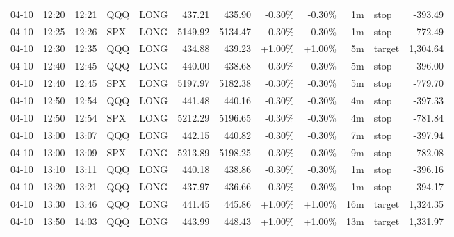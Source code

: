 \documentclass[11pt,a4paper,twoside]{article}
\begin{document}
\begin{center}
\begin{longtable}{>{\color{txtmain}}l l l l l r r r r r >{\color{txtmain}}l r}
04-10 & 12:20 & 12:21 & QQQ & LONG & 437.21 & 435.90 & \textcolor{lossred}{-0.30\%} & \textcolor{lossred}{-0.30\%} & 1m & stop & \textcolor{lossred}{-393.49} \\
04-10 & 12:25 & 12:26 & SPX & LONG & 5149.92 & 5134.47 & \textcolor{lossred}{-0.30\%} & \textcolor{lossred}{-0.30\%} & 1m & stop & \textcolor{lossred}{-772.49} \\
04-10 & 12:30 & 12:35 & QQQ & LONG & 434.88 & 439.23 & \textcolor{wingreen}{+1.00\%} & \textcolor{wingreen}{+1.00\%} & 5m & target & \textcolor{wingreen}{1,304.64} \\
04-10 & 12:40 & 12:45 & QQQ & LONG & 440.00 & 438.68 & \textcolor{lossred}{-0.30\%} & \textcolor{lossred}{-0.30\%} & 5m & stop & \textcolor{lossred}{-396.00} \\
04-10 & 12:40 & 12:45 & SPX & LONG & 5197.97 & 5182.38 & \textcolor{lossred}{-0.30\%} & \textcolor{lossred}{-0.30\%} & 5m & stop & \textcolor{lossred}{-779.70} \\
04-10 & 12:50 & 12:54 & QQQ & LONG & 441.48 & 440.16 & \textcolor{lossred}{-0.30\%} & \textcolor{lossred}{-0.30\%} & 4m & stop & \textcolor{lossred}{-397.33} \\
04-10 & 12:50 & 12:54 & SPX & LONG & 5212.29 & 5196.65 & \textcolor{lossred}{-0.30\%} & \textcolor{lossred}{-0.30\%} & 4m & stop & \textcolor{lossred}{-781.84} \\
04-10 & 13:00 & 13:07 & QQQ & LONG & 442.15 & 440.82 & \textcolor{lossred}{-0.30\%} & \textcolor{lossred}{-0.30\%} & 7m & stop & \textcolor{lossred}{-397.94} \\
04-10 & 13:00 & 13:09 & SPX & LONG & 5213.89 & 5198.25 & \textcolor{lossred}{-0.30\%} & \textcolor{lossred}{-0.30\%} & 9m & stop & \textcolor{lossred}{-782.08} \\
04-10 & 13:10 & 13:11 & QQQ & LONG & 440.18 & 438.86 & \textcolor{lossred}{-0.30\%} & \textcolor{lossred}{-0.30\%} & 1m & stop & \textcolor{lossred}{-396.16} \\
04-10 & 13:20 & 13:21 & QQQ & LONG & 437.97 & 436.66 & \textcolor{lossred}{-0.30\%} & \textcolor{lossred}{-0.30\%} & 1m & stop & \textcolor{lossred}{-394.17} \\
04-10 & 13:30 & 13:46 & QQQ & LONG & 441.45 & 445.86 & \textcolor{wingreen}{+1.00\%} & \textcolor{wingreen}{+1.00\%} & 16m & target & \textcolor{wingreen}{1,324.35} \\
04-10 & 13:50 & 14:03 & QQQ & LONG & 443.99 & 448.43 & \textcolor{wingreen}{+1.00\%} & \textcolor{wingreen}{+1.00\%} & 13m & target & \textcolor{wingreen}{1,331.97} \\

\end{longtable}
\end{center}
\end{document}
